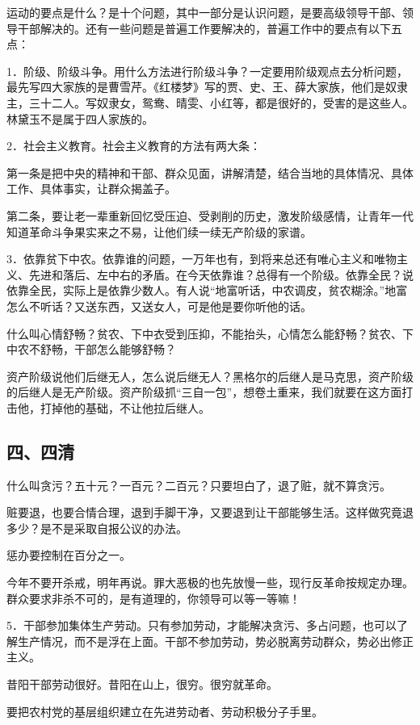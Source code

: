 运动的要点是什么？是十个问题，其中一部分是认识问题，是要高级领导干部、领导干部解决的。还有一些问题是普遍工作要解决的，普遍工作中的要点有以下五点：

1．阶级、阶级斗争。用什么方法进行阶级斗争？一定要用阶级观点去分析问题，最先写四大家族的是曹雪芹。《红楼梦》写的贾、史、王、薛大家族，他们是奴隶主，三十二人。写奴隶女，鸳鸯、晴雯、小红等，都是很好的，受害的是这些人。林黛玉不是属于四人家族的。

2．社会主义教育。社会主义教育的方法有两大条：

第一条是把中央的精神和干部、群众见面，讲解清楚，结合当地的具体情况、具体工作、具体事实，让群众揭盖子。

第二条，要让老一辈重新回忆受压迫、受剥削的历史，激发阶级感情，让青年一代知道革命斗争果实来之不易，让他们续一续无产阶级的家谱。

3．依靠贫下中农。依靠谁的问题，一万年也有，到将来总还有唯心主义和唯物主义、先进和落后、左中右的矛盾。在今天依靠谁？总得有一个阶级。依靠全民？说依靠全民，实际上是依靠少数人。有人说“地富听话，中农调皮，贫农糊涂。”地富怎么不听话？又送东西，又送女人，可是他是要你听他的话。

什么叫心情舒畅？贫农、下中衣受到压抑，不能抬头，心情怎么能舒畅？贫农、下中农不舒畅，干部怎么能够舒畅？

资产阶级说他们后继无人，怎么说后继无人？黑格尔的后继人是马克思，资产阶级的后继人是无产阶级。资产阶级抓“三自一包”，想卷土重来，我们就要在这方面打击他，打掉他的基础，不让他拉后继人。

\subsection{四、四清}

什么叫贪污？五十元？一百元？二百元？只要坦白了，退了赃，就不算贪污。

赃要退，也要合情合理，退到手脚干净，又要退到让干部能够生活。这样做究竟退多少？是不是采取自报公议的办法。

惩办要控制在百分之一。

今年不要开杀戒，明年再说。罪大恶极的也先放慢一些，现行反革命按规定办理。群众要求非杀不可的，是有道理的，你领导可以等一等嘛！

5．干部参加集体生产劳动。只有参加劳动，才能解决贪污、多占问题，也可以了解生产情况，而不是浮在上面。干部不参加劳动，势必脱离劳动群众，势必出修正主义。

昔阳干部劳动很好。昔阳在山上，很穷。很穷就革命。

要把农村党的基层组织建立在先进劳动者、劳动积极分子手里。

